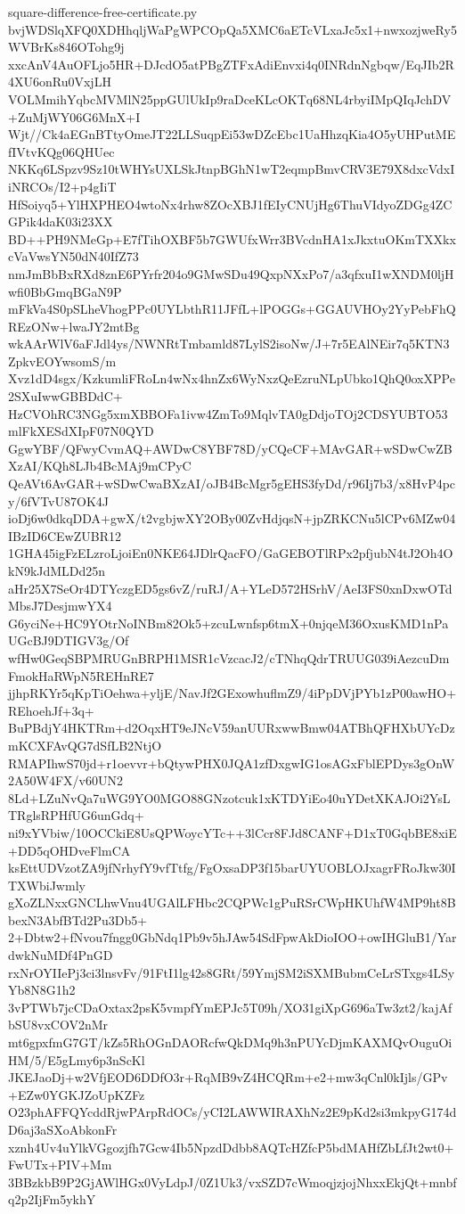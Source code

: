 \documentclass[11pt]{article}
\theoremstyle{definition}
\theoremstyle{remark}
\begin{document}
\begin{filecontents*}[overwrite]{square-difference-free-certificate.py}
bvjWDSlqXFQ0XDHhqljWaPgWPCOpQa5XMC6aETcVLxaJc5x1+nwxozjweRy5WVBrKs846OTohg9j
xxcAnV4AuOFLjo5HR+DJcdO5atPBgZTFxAdiEnvxi4q0INRdnNgbqw/EqJIb2R4XU6onRu0VxjLH
VOLMmihYqbcMVMlN25ppGUlUkIp9raDceKLcOKTq68NL4rbyiIMpQIqJchDV+ZuMjWY06G6MnX+I
Wjt//Ck4aEGnBTtyOmeJT22LLSuqpEi53wDZcEbc1UaHhzqKia4O5yUHPutMEfIVtvKQg06QHUec
NKKq6LSpzv9Sz10tWHYsUXLSkJtnpBGhN1wT2eqmpBmvCRV3E79X8dxcVdxIiNRCOs/I2+p4gIiT
HfSoiyq5+YlHXPHEO4wtoNx4rhw8ZOcXBJ1fEIyCNUjHg6ThuVIdyoZDGg4ZCGPik4daK03i23XX
BD++PH9NMeGp+E7fTihOXBF5b7GWUfxWrr3BVcdnHA1xJkxtuOKmTXXkxcVaVwsYN50dN40IfZ73
nmJmBbBxRXd8znE6PYrfr204o9GMwSDu49QxpNXxPo7/a3qfxuI1wXNDM0ljHwfi0BbGmqBGaN9P
mFkVa4S0pSLheVhogPPc0UYLbthR11JFfL+lPOGGs+GGAUVHOy2YyPebFhQREzONw+lwaJY2mtBg
wkAArWlV6aFJdl4ys/NWNRtTmbamld87LylS2isoNw/J+7r5EAlNEir7q5KTN3ZpkvEOYwsomS/m
Xvz1dD4sgx/KzkumliFRoLn4wNx4hnZx6WyNxzQeEzruNLpUbko1QhQ0oxXPPe2SXuIwwGBBDdC+
HzCVOhRC3NGg5xmXBBOFa1ivw4ZmTo9MqlvTA0gDdjoTOj2CDSYUBTO53mlFkXESdXIpF07N0QYD
GgwYBF/QFwyCvmAQ+AWDwC8YBF78D/yCQeCF+MAvGAR+wSDwCwZBXzAI/KQh8LJb4BcMAj9mCPyC
QeAVt6AvGAR+wSDwCwaBXzAI/oJB4BcMgr5gEHS3fyDd/r96Ij7b3/x8HvP4pcy/6fVTvU87OK4J
ioDj6w0dkqDDA+gwX/t2vgbjwXY2OBy00ZvHdjqsN+jpZRKCNu5lCPv6MZw04IBzID6CEwZUBR12
1GHA45igFzELzroLjoiEn0NKE64JDlrQacFO/GaGEBOTlRPx2pfjubN4tJ2Oh4OkN9kJdMLDd25n
aHr25X7SeOr4DTYczgED5gs6vZ/ruRJ/A+YLeD572HSrhV/AeI3FS0xnDxwOTdMbsJ7DesjmwYX4
G6yciNe+HC9YOtrNoINBm82Ok5+zcuLwnfsp6tmX+0njqeM36OxusKMD1nPaUGcBJ9DTIGV3g/Of
wfHw0GeqSBPMRUGnBRPH1MSR1cVzcacJ2/cTNhqQdrTRUUG039iAezcuDmFmokHaRWpN5REHnRE7
jjhpRKYr5qKpTiOehwa+yljE/NavJf2GExowhuflmZ9/4iPpDVjPYb1zP00awHO+REhoehJf+3q+
BuPBdjY4HKTRm+d2OqxHT9eJNcV59anUURxwwBmw04ATBhQFHXbUYcDzmKCXFAvQG7dSfLB2NtjO
RMAPIhwS70jd+r1oevvr+bQtywPHX0JQA1zfDxgwIG1osAGxFblEPDys3gOnW2A50W4FX/v60UN2
8Ld+LZuNvQa7uWG9YO0MGO88GNzotcuk1xKTDYiEo40uYDetXKAJOi2YsLTRglsRPHfUG6unGdq+
ni9xYVbiw/10OCCkiE8UsQPWoycYTc++3lCcr8FJd8CANF+D1xT0GqbBE8xiE+DD5qOHDveFlmCA
ksEttUDVzotZA9jfNrhyfY9vfTtfg/FgOxsaDP3f15barUYUOBLOJxagrFRoJkw30ITXWbiJwmly
gXoZLNxxGNCLhwVnu4UGAlLFHbc2CQPWc1gPuRSrCWpHKUhfW4MP9ht8BbexN3AbfBTd2Pu3Db5+
2+Dbtw2+fNvou7fngg0GbNdq1Pb9v5hJAw54SdFpwAkDioIOO+owIHGluB1/YardwkNuMDf4PnGD
rxNrOYIIePj3ci3lnsvFv/91FtI1lg42s8GRt/59YmjSM2iSXMBubmCeLrSTxgs4LSyYb8N8G1h2
3vPTWb7jcCDaOxtax2psK5vmpfYmEPJc5T09h/XO31giXpG696aTw3zt2/kajAfbSU8vxCOV2nMr
mt6gpxfmG7GT/kZs5RhOGnDAORcfwQkDMq9h3nPUYcDjmKAXMQvOuguOiHM/5/E5gLmy6p3nScKl
JKEJaoDj+w2VfjEOD6DDfO3r+RqMB9vZ4HCQRm+e2+mw3qCnl0kIjls/GPv+EZw0YGKJZoUpKZFz
O23phAFFQYcddRjwPArpRdOCs/yCI2LAWWIRAXhNz2E9pKd2si3mkpyG174dD6aj3aSXoAbkonFr
xznh4Uv4uYlkVGgozjfh7Gcw4Ib5NpzdDdbb8AQTcHZfcP5bdMAHfZbLfJt2wt0+FwUTx+PIV+Mm
3BBzkbB9P2GjAWlHGx0VyLdpJ/0Z1Uk3/vxSZD7cWmoqjzjojNhxxEkjQt+mnbfq2p2IjFm5ykhY

\end{filecontents*}
\end{document}
